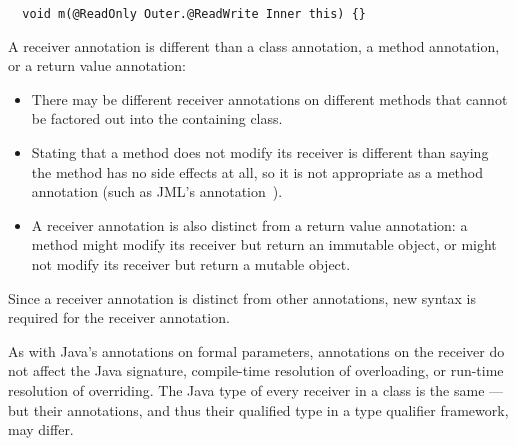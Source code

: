 \documentclass[10pt]{article}
\begin{document}
\preverbnegspace
\begin{Verbatim}
  void m(@ReadOnly Outer.@ReadWrite Inner this) {}
\end{Verbatim}


A receiver annotation is different than a class annotation, a method
annotation, or a return value annotation:
\begin{itemize}
\item
  There may be different receiver annotations on different methods that
  cannot be factored out into the containing class.

\item
  Stating that a method does not modify its receiver is different than
  saying the method has no side effects at all, so it is not appropriate as
  a method annotation (such as JML's 
  annotation~\cite{LeavensBR2006:JML}).

\item
  A receiver annotation is also distinct from a return value
  annotation:  a method might modify its receiver but return an immutable
  object, or might not modify its receiver but return a mutable object.
\end{itemize}

% 
% 

\noindent
Since a receiver annotation is distinct from other
annotations, new syntax is required for the receiver annotation.



As with Java's annotations on formal parameters, annotations on the
receiver do not affect the Java signature,
compile-time resolution of overloading, or run-time resolution of
overriding.  The Java type of every receiver in a class is the same --- but
their annotations, and thus their qualified type in a type qualifier
framework, may differ.
\end{document}
